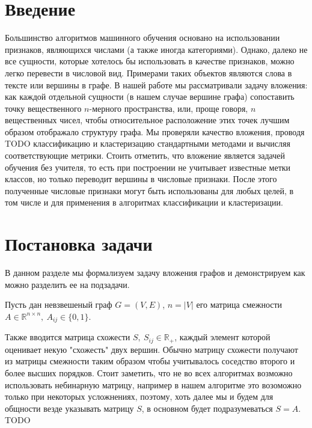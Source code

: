 \documentclass[12pt,a4paper]{extarticle}
\newcommand{\R}{\mathbb{R}}
\begin{document}
    \tableofcontents

    \newpage

    \section{Введение}
    Большинство алгоритмов машинного обучения основано на использовании
    признаков, являющихся числами (а также иногда категориями).
    Однако, далеко не все сущности, которые хотелось бы использовать в качестве признаков,
    можно легко перевести в числовой вид.
    Примерами таких объектов являются слова в тексте или вершины в графе.
    В нашей работе мы рассматривали задачу вложения: как каждой отдельной сущности (в нашем
    случае вершине графа) сопоставить точку вещественного $n$-мерного пространства,
    или, проще говоря, $n$ вещественных чисел, чтобы относительное
    расположение этих точек лучшим образом отображало структуру графа.
    Мы проверяли качество вложения, проводя TODO классификацию и кластеризацию
    стандартными методами и вычисляя соответствующие метрики.
    Стоить отметить, что вложение является задачей обучения без учителя,
    то есть при построении не учитывает известные метки классов, но только
    переводит вершины в числовые признаки.
    После этого полученные числовые признаки могут быть использованы для любых целей, в том числе и для
    применения в алгоритмах классификации и кластеризации.

    \section{Постановка задачи}
    В данном разделе мы формализуем задачу вложения графов и демонстрируем как можно разделить ее на подзадачи.

    Пусть дан невзвешеный граф $G = (V, E)$, $n = |V|$ его матрица смежности $A \in \R^{n \times n},\ A_{ij} \in \{0, 1\}$.
    
    Также вводится матрица схожести $S,\ S_{ij} \in \R_{+}$,  каждый элемент которой оценивает некую "схожесть" двух вершин. Обычно матрицу схожести получают из матрицы смежности таким образом чтобы учитывалось соседство второго и более высших порядков. Стоит заметить, что не во всех алгоритмах возможно использовать небинарную матрицу, например в нашем алгоритме это возоможно только при некоторых усложнениях, поэтому, хоть далее мы и будем для общности везде указывать матрицу $S$, в основном будет подразумеваться $S = A$. TODO
    
\end{document}
